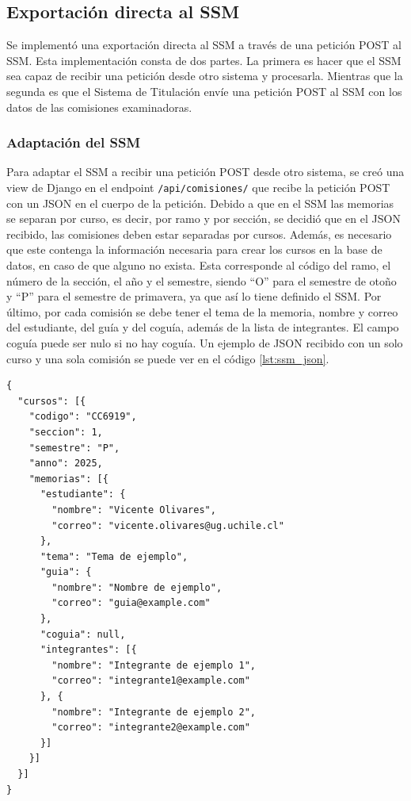 \subsection{Exportación directa al SSM}\label{subsec:exportacion:ssm_directa}
Se implementó una exportación directa al SSM a través de una petición POST al SSM.
Esta implementación consta de dos partes. La primera es hacer que el SSM sea capaz de
recibir una petición desde otro sistema y procesarla. Mientras que la segunda es que el
Sistema de Titulación envíe una petición POST al SSM con los datos de las comisiones examinadoras.

\subsubsection{Adaptación del SSM}\label{subsubsec:adaptacion_ssm}
Para adaptar el SSM a recibir una petición POST desde otro sistema, se creó una view
de Django en el endpoint \texttt{/api/comisiones/} que recibe la petición POST con un
JSON en el cuerpo de la petición. Debido a que en el SSM las memorias se separan por
curso, es decir, por ramo y por sección, se decidió que en el JSON recibido, las
comisiones deben estar separadas por cursos. Además, es necesario que este contenga la
información necesaria para crear los cursos en la base de datos, en caso de que alguno
no exista. Esta corresponde al código del ramo, el número de la sección, el año y el
semestre, siendo ``O'' para el semestre de otoño y ``P'' para el semestre de primavera,
ya que así lo tiene definido el SSM. Por último, por cada comisión se debe tener el tema
de la memoria, nombre y correo del estudiante, del guía y del coguía, además de la lista
de integrantes. El campo coguía puede ser nulo si no hay coguía. Un ejemplo de JSON
recibido con un solo curso y una sola comisión se puede ver en el código
\ref{lst:ssm_json}.
\newpage
\begin{lstlisting}[label=lst:ssm_json, caption={Ejemplo de JSON recibido con un solo curso y una sola comisión.}]
{
  "cursos": [{
    "codigo": "CC6919",
    "seccion": 1,
    "semestre": "P",
    "anno": 2025,
    "memorias": [{
      "estudiante": {
        "nombre": "Vicente Olivares",
        "correo": "vicente.olivares@ug.uchile.cl"
      },
      "tema": "Tema de ejemplo",
      "guia": {
        "nombre": "Nombre de ejemplo",
        "correo": "guia@example.com"
      },
      "coguia": null,
      "integrantes": [{
        "nombre": "Integrante de ejemplo 1",
        "correo": "integrante1@example.com"
      }, {
        "nombre": "Integrante de ejemplo 2",
        "correo": "integrante2@example.com"
      }]
    }]
  }]
}
\end{lstlisting}

